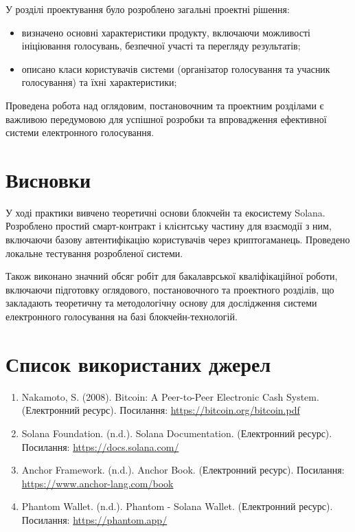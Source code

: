 \documentclass[14pt]{extreport}
\begin{document}
 У розділі проектування було розроблено загальні проектні рішення:
 
 \begin{itemize}
   \item визначено основні характеристики продукту, включаючи можливості ініціювання голосувань, безпечної участі та перегляду результатів;
\item описано класи користувачів системи (організатор голосування та учасник голосування) та їхні характеристики; 
 \end{itemize}

Проведена робота над оглядовим, постановочним та проектним розділами є важливою передумовою для успішної розробки та впровадження ефективної системи електронного голосування.

\section*{Висновки}

У ході практики вивчено теоретичні основи блокчейн та екосистему Solana. Розроблено простий смарт-контракт і клієнтську частину для взаємодії з ним, включаючи базову автентифікацію користувачів через криптогаманець. Проведено локальне тестування розробленої системи.

Також виконано значний обсяг робіт для бакалаврської кваліфікаційної роботи, включаючи підготовку оглядового, постановочного та проектного розділів, що закладають теоретичну та методологічну основу для дослідження системи електронного голосування на базі блокчейн-технологій.

\newpage
\section*{Список використаних джерел}

\begin{enumerate}
\item Nakamoto, S. (2008). Bitcoin: A Peer-to-Peer Electronic Cash System. (Електронний ресурс). Посилання: \href{https://bitcoin.org/bitcoin.pdf}{https://bitcoin.org/bitcoin.pdf}
\item Solana Foundation. (n.d.). Solana Documentation. (Електронний ресурс). Посилання: \href{https://docs.solana.com/}{https://docs.solana.com/}
\item Anchor Framework. (n.d.). Anchor Book. (Електронний ресурс). Посилання: \href{https://www.anchor-lang.com/book}{https://www.anchor-lang.com/book}
\item Phantom Wallet. (n.d.). Phantom - Solana Wallet. (Електронний ресурс). Посилання: \href{https://phantom.app/}{https://phantom.app/}

\end{enumerate}
\end{document}
